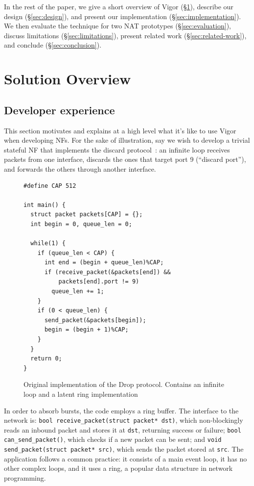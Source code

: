 \documentclass[letterpaper,twocolumn,10pt]{article}
\newcommand{\code}[1]{\lstinline{#1}}
\begin{document}
In the rest of the paper, we give a short overview of Vigor
(\S\ref{sec:solution-overview}), describe our design (\S\ref{sec:design}), and
present our implementation (\S\ref{sec:implementation}). We then evaluate the
technique for two NAT prototypes (\S\ref{sec:evaluation}), discuss limitations
(\S\ref{sec:limitations}), present related work (\S\ref{sec:related-work}), and
conclude (\S\ref{sec:conclusion}).


\section{Solution Overview}
\label{sec:solution-overview}

\subsection{Developer experience}

This section motivates and explains at a high level what it's like to use Vigor
when developing NFs. For the sake of illustration, say we wish to develop a
trivial stateful NF that implements the discard protocol~\cite{rfc863}: an
infinite loop receives packets from one interface, discards the ones that target
port 9 (``discard port''), and forwards the others through another interface.

\begin{figure}[h!]
\begin{lstlisting}
#define CAP 512

int main() {
  struct packet packets[CAP] = {};
  int begin = 0, queue_len = 0;

  while(1) {
    if (queue_len < CAP) {
      int end = (begin + queue_len)%CAP;
      if (receive_packet(&packets[end]) &&
          packets[end].port != 9)
        queue_len += 1;
    }
    if (0 < queue_len) {
      send_packet(&packets[begin]);
      begin = (begin + 1)%CAP;
    }
  }
  return 0;
}
\end{lstlisting}
  \caption{Original implementation of the Drop protocol. Contains an infinite
    loop and a latent ring implementation}
  \label{lst:orig}
\end{figure}

In order to absorb bursts, the code employs a ring buffer. The interface to the
network is: \code{bool receive_packet(struct packet* dst)}, which non-blockingly
reads an inbound packet and stores it at \code{dst}, returning success or
failure; \code{bool can_send_packet()}, which checks if a new packet can be
sent; and \code{void send_packet(struct packet* src)}, which sends the packet
stored at \code{src}. The application follows a common practice: it consists of a
main event loop, it has no other complex loops, and it uses a ring, a popular
data structure in network programming.
\end{document}
